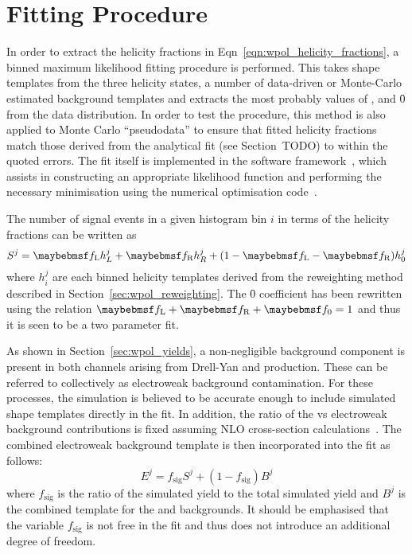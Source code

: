 


\section{Fitting Procedure}
\label{sec:wpol_fitting}
In order to extract the helicity fractions in
Eqn~\ref{eqn:wpol_helicity_fractions}, a binned maximum likelihood fitting
procedure is performed. This takes \LP shape templates from the three \PW
helicity states, a number of data-driven or Monte-Carlo estimated background
templates and extracts the most probably values of \fL, \fR and \f0 from the
data distribution. In order to test the procedure, this method is also applied
to Monte Carlo ``pseudodata'' to ensure that fitted helicity fractions match
those derived from the analytical fit (see Section~TODO) to within the quoted
errors. The fit itself is implemented in the \roofit software
framework~\cite{roofit_paper, roofit_web}, which assists in constructing an
appropriate likelihood function and performing the necessary minimisation using
the \minuit numerical optimisation code~\cite{minuit_paper}.

The number of signal events in a given histogram bin $i$ in terms of the
helicity fractions can be written as
\begin{equation}
S^j = \fL h_L^j + \fR h_R^j + (1-\fL-\fR)h_0^j
\end{equation}
where $h_i^j$ are each binned helicity templates derived from the reweighting
method described in Section~\ref{sec:wpol_reweighting}. The \f0
coefficient has been rewritten using the relation $\fL + \fR +\f0 = 1$ and thus
it is seen to be a two parameter fit.

As shown in Section~\ref{sec:wpol_yields}, a non-negligible background component
is present in both channels arising from Drell-Yan and \ttbar production. These
can be referred to collectively as electroweak background contamination. For
these processes, the simulation is believed to be accurate enough to include
simulated \LP shape templates directly in the fit. In addition, the ratio of the
\Wjets vs electroweak background contributions is fixed assuming \ac{NLO}
cross-section
calculations~\cite{ellis_wp3jet,berger_wp4jet,heavy_quark,top_quark,drellyan}. The
combined electroweak background template is then incorporated into the fit as
follows:
\begin{equation}
E^j = f_{\textrm{sig}} S^j + (1-f_{\textrm{sig}}) B^j
\end{equation}
where $f_{\textrm{sig}}$ is the ratio of the simulated \Wjets yield to the total
simulated yield and $B^j$ is the combined \LP template for the \Zjets and \ttbar
backgrounds. It should be emphasised that the variable $f_{\textrm{sig}}$ is not
free in the fit and thus does not introduce an additional degree of freedom.

